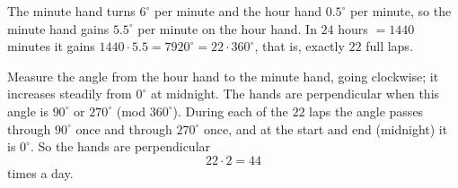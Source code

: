 The minute hand turns $6^\circ$ per minute and the hour hand $0.5^\circ$ per minute, so the minute hand gains $5.5^\circ$ per minute on the hour hand. In $24$ hours $=1440$ minutes it gains $1440\cdot5.5=7920^\circ=22\cdot360^\circ$, that is, exactly $22$ full laps.

Measure the angle from the hour hand to the minute hand, going clockwise; it increases steadily from $0^\circ$ at midnight. The hands are perpendicular when this angle is $90^\circ$ or $270^\circ$ (mod $360^\circ$). During each of the $22$ laps the angle passes through $90^\circ$ once and through $270^\circ$ once, and at the start and end (midnight) it is $0^\circ$. So the hands are perpendicular
\[
22\cdot2=\boxed{44}
\]
times a day.
